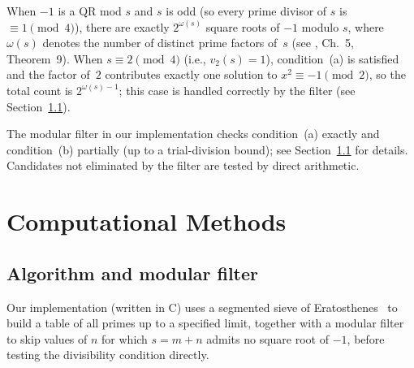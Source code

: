 \documentclass{amsart}
\theoremstyle{definition}
\theoremstyle{remark}
\numberwithin{equation}{section}
\begin{document}
When $-1$ is a QR mod $s$ and $s$ is odd (so every prime divisor of
$s$ is $\equiv 1 \pmod{4}$), there are exactly $2^{\omega(s)}$ square
roots of $-1$ modulo $s$, where $\omega(s)$ denotes the number of
distinct prime factors of~$s$ (see \cite{IrelandRosen}, Ch.~5,
Theorem~9).
When $s \equiv 2 \pmod{4}$ (i.e., $v_2(s) = 1$), condition~(a) is
satisfied and the factor of~$2$ contributes exactly one solution to
$x^2 \equiv -1 \pmod{2}$, so the total count is $2^{\omega(s)-1}$;
this case is handled correctly by the filter
(see Section~\ref{sec:filter}).

The modular filter in our implementation checks condition~(a) exactly
and condition~(b) partially (up to a trial-division bound); see
Section~\ref{sec:filter} for details.
Candidates not eliminated by the filter are tested by direct arithmetic.

\section{Computational Methods}

\subsection{Algorithm and modular filter}
\label{sec:filter}

Our implementation (written in C) uses a segmented sieve of
Eratosthenes~\cite{CrandallPomerance} to build a table of all primes up
to a specified limit, together with a modular filter to skip values of
$n$ for which $s = m + n$ admits no square root of $-1$, before testing
the divisibility condition directly.
\end{document}
